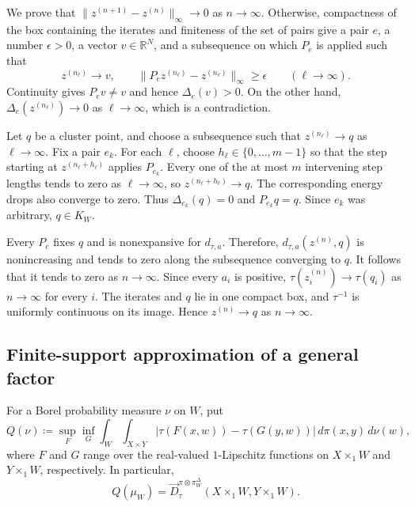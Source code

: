 \documentclass[11pt]{amsart}
\theoremstyle{plain}
\theoremstyle{definition}
\theoremstyle{remark}
\newcommand{\R}{\mathbb R}
\begin{document}
We prove that $\|z^{(n+1)}-z^{(n)}\|_\infty\to0$ as $n\to\infty$. Otherwise, compactness of the box containing the iterates and finiteness of the set of pairs give a pair $e$, a number $\epsilon>0$, a vector $v\in\R^N$, and a subsequence on which $P_e$ is applied such that
\[
z^{(n_\ell)}\longrightarrow v,\qquad\|P_ez^{(n_\ell)}-z^{(n_\ell)}\|_\infty\geq\epsilon\qquad(\ell\to\infty).
\]
Continuity gives $P_ev\neq v$ and hence $\Delta_e(v)>0$. On the other hand, $\Delta_e(z^{(n_\ell)})\to0$ as $\ell\to\infty$, which is a contradiction.

Let $q$ be a cluster point, and choose a subsequence such that $z^{(n_\ell)}\to q$ as $\ell\to\infty$. Fix a pair $e_k$. For each $\ell$, choose $h_\ell\in\{0,\ldots,m-1\}$ so that the step starting at $z^{(n_\ell+h_\ell)}$ applies $P_{e_k}$. Every one of the at most $m$ intervening step lengths tends to zero as $\ell\to\infty$, so $z^{(n_\ell+h_\ell)}\to q$. The corresponding energy drops also converge to zero. Thus $\Delta_{e_k}(q)=0$ and $P_{e_k}q=q$. Since $e_k$ was arbitrary, $q\in K_W$.

Every $P_e$ fixes $q$ and is nonexpansive for $d_{\tau,a}$. Therefore, $d_{\tau,a}(z^{(n)},q)$ is nonincreasing and tends to zero along the subsequence converging to $q$. It follows that it tends to zero as $n\to\infty$. Since every $a_i$ is positive, $\tau(z_i^{(n)})\to\tau(q_i)$ as $n\to\infty$ for every $i$. The iterates and $q$ lie in one compact box, and $\tau^{-1}$ is uniformly continuous on its image. Hence $z^{(n)}\to q$ as $n\to\infty$.

\subsection{Finite-support approximation of a general factor}
\label{subsec:app-factor-approximation}

For a Borel probability measure $\nu$ on $W$, put
\[
Q(\nu)\coloneqq\sup_F\inf_G\int_W\int_{X\times Y}|\tau(F(x,w))-\tau(G(y,w))|\,d\pi(x,y)\,d\nu(w),
\]
where $F$ and $G$ range over the real-valued $1$-Lipschitz functions on $X\times_1W$ and $Y\times_1W$, respectively. In particular,
\[
Q(\mu_W)=\overrightarrow D_\tau^{\pi\otimes\pi_W^\Delta}(X\times_1W,Y\times_1W).
\]
\end{document}

